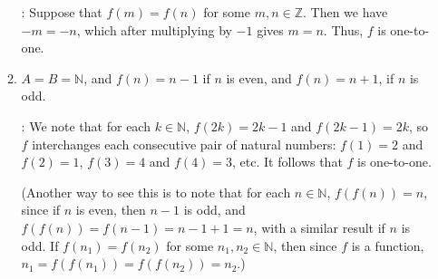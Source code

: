 \documentclass[12pt]{article}
\newcommand{\points}[1]{\marginpar{\hspace{24pt}[#1]}}
\newcommand{\Z}{\mathbb{Z}}
\newcommand{\N}{\mathbb{N}}
\begin{document}
\begin{enumerate}
\begin{enumerate}
\bigskip

: Suppose that $f(m)=f(n)$ for some $m,n\in\Z$. Then we have $-m=-n$, which after multiplying by $-1$ gives $m=n$. Thus, $f$ is one-to-one.

\bigskip

 \item $A=B=\N$, and $f(n)=n-1$ if $n$ is even, and $f(n)=n+1$, if $n$ is odd.\points{2}

\bigskip

: We note that for each $k\in \N$, $f(2k)=2k-1$ and $f(2k-1) = 2k$, so $f$ interchanges each consecutive pair of natural numbers: $f(1)=2$ and $f(2)=1$, $f(3)=4$ and $f(4)=3$, etc. It follows that $f$ is one-to-one.

(Another way to see this is to note that for each $n\in\N$, $f(f(n))=n$, since if $n$ is even, then $n-1$ is odd, and $f(f(n))=f(n-1)=n-1+1=n$, with a similar result if $n$ is odd. If $f(n_1)=f(n_2)$ for some $n_1,n_2\in\N$, then since $f$ is a function, $n_1=f(f(n_1))=f(f(n_2))=n_2$.)
\end{enumerate}
 \end{enumerate}
\end{document}
